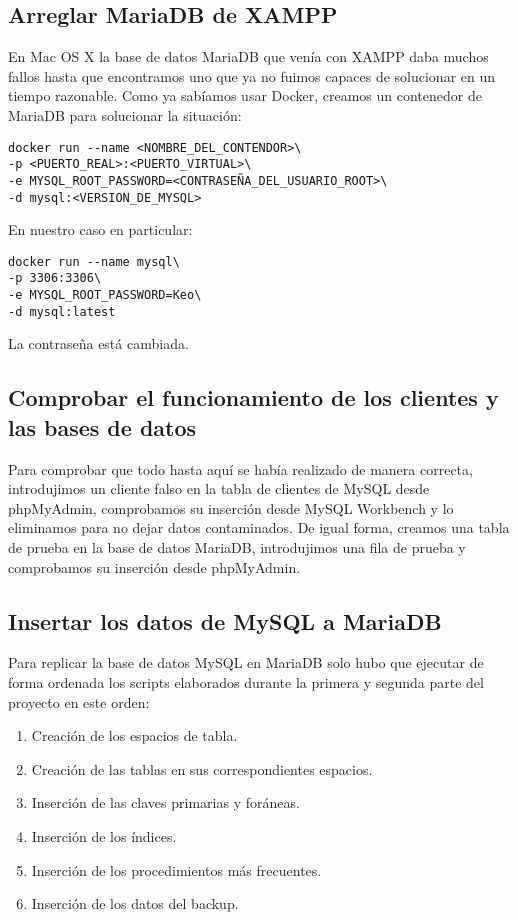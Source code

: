 \documentclass[a4paper, 11pt, oneside]{article} %
\begin{document}
\subsection{Arreglar MariaDB de XAMPP}

En Mac OS X la base de datos MariaDB que venía con XAMPP daba muchos fallos hasta que encontramos uno que ya no fuimos capaces de solucionar en un tiempo razonable. Como ya sabíamos usar Docker, creamos un contenedor de MariaDB para solucionar la situación:

\begin{verbatim}
docker run --name <NOMBRE_DEL_CONTENDOR>\
-p <PUERTO_REAL>:<PUERTO_VIRTUAL>\
-e MYSQL_ROOT_PASSWORD=<CONTRASEÑA_DEL_USUARIO_ROOT>\
-d mysql:<VERSION_DE_MYSQL>
\end{verbatim}

En nuestro caso en particular:

\begin{verbatim}
docker run --name mysql\
-p 3306:3306\
-e MYSQL_ROOT_PASSWORD=Keo\
-d mysql:latest
\end{verbatim}

La contraseña está cambiada.




\subsection{Comprobar el funcionamiento de los clientes y las bases de datos}

Para comprobar que todo hasta aquí se había realizado de manera correcta, introdujimos un cliente falso en la tabla de clientes de MySQL desde phpMyAdmin, comprobamos su inserción desde MySQL Workbench y lo eliminamos para no dejar datos contaminados. De igual forma, creamos una tabla de prueba en la base de datos MariaDB, introdujimos una fila de prueba y comprobamos su inserción desde phpMyAdmin.




\subsection{Insertar los datos de MySQL a MariaDB}

Para replicar la base de datos MySQL en MariaDB solo hubo que ejecutar de forma ordenada los scripts elaborados durante la primera y segunda parte del proyecto en este orden:

\begin{enumerate}
	\item Creación de los espacios de tabla.
	\item Creación de las tablas en sus correspondientes espacios.
	\item Inserción de las claves primarias y foráneas.
	\item Inserción de los índices.
	\item Inserción de los procedimientos más frecuentes.
	\item Inserción de los datos del backup.
\end{enumerate}
\end{document}
